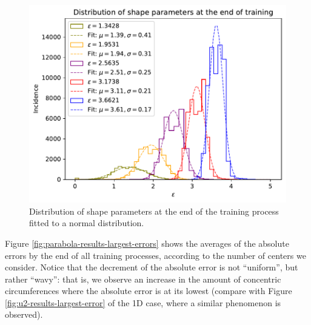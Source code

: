 \documentclass[12pt]{report} %
\begin{document}
\begin{figure}[h]
  \includegraphics[width=.8\textwidth]{imagenes/experiments/2d/statistical_2d_full_scheduler_interpolation/parabola/distribution_of_shape_parameters_at_end_of_training.pdf}
  \caption{Distribution of shape parameters at the end of the training process fitted to a normal distribution.}
  \label{fig:parabola-results-shape-parameters}
\end{figure}

Figure \ref{fig:parabola-results-largest-errors} shows the averages of the absolute errors by the end of all training processes, according to the number of centers we consider. Notice that the decrement of the absolute error is not ``uniform'', but rather ``wavy'': that is, we observe an increase in the amount of concentric circumferences where the absolute error is at its lowest (compare with Figure \ref{fig:u2-results-largest-error} of the 1D case, where a similar phenomenon is observed).
\end{document}
